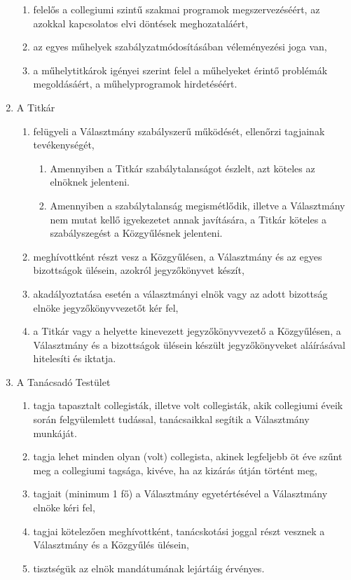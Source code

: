 \documentclass{../styles/rulebook}
\begin{document}
\begin{enumerate}
\begin{enumerate}
		\item felelős a collegiumi szintű szakmai programok megszervezéséért, az azokkal kapcsolatos elvi döntések meghozataláért,
		\item az egyes műhelyek szabályzatmódosításában véleményezési joga van,
		\item a műhelytitkárok igényei szerint felel a műhelyeket érintő problémák megoldásáért, a műhelyprogramok hirdetéséért.
	\end{enumerate}
	\item A Titkár
	\begin{enumerate}
		\item felügyeli a Választmány szabályszerű működését, ellenőrzi tagjainak tevékenységét,
		\begin{enumerate}
			\item Amennyiben a Titkár szabálytalanságot észlelt, azt köteles az elnöknek jelenteni.
			\item Amennyiben a szabálytalanság megismétlődik, illetve a Választmány nem mutat kellő igyekezetet annak javítására, a Titkár köteles a szabályszegést a Közgyűlésnek jelenteni.
		\end{enumerate}
		\item meghívottként részt vesz a Közgyűlésen, a Választmány és az egyes bizottságok ülésein, azokról jegyzőkönyvet készít,
		\item akadályoztatása esetén a választmányi elnök vagy az adott bizottság elnöke jegyzőkönyvvezetőt kér fel,
		\item a Titkár vagy a helyette kinevezett jegyzőkönyvvezető a Közgyűlésen, a Választmány és a bizottságok ülésein készült jegyzőkönyveket aláírásával hitelesíti és iktatja.
	\end{enumerate}
	\item A Tanácsadó Testület
	\begin{enumerate}
		\item tagja tapasztalt collegisták, illetve volt collegisták, akik collegiumi éveik során felgyülemlett tudással, tanácsaikkal segítik a Választmány munkáját.
		\item tagja lehet minden olyan (volt) collegista, akinek legfeljebb öt éve szűnt meg a collegiumi tagsága, kivéve, ha az kizárás útján történt meg,
		\item tagjait (minimum 1 fő) a Választmány egyetértésével a Választmány elnöke kéri fel,
		\item tagjai kötelezően meghívottként, tanácskotási joggal részt vesznek a Választmány és a Közgyűlés ülésein,
		\item tisztségük az elnök mandátumának lejártáig érvényes.
	\end{enumerate}
\end{enumerate}
\end{document}
